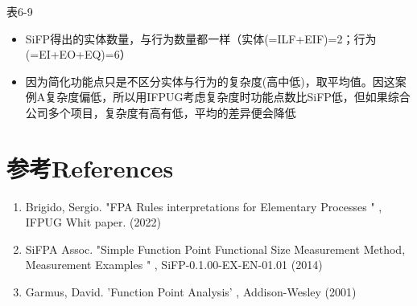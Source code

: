 表6-9

\begin{itemize}
\tightlist
\item
  SiFP得出的实体数量，与行为数量都一样（实体(=ILF+EIF)=2；行为(=EI+EO+EQ)=6）
\item
  因为简化功能点只是不区分实体与行为的复杂度(高中低)，取平均值。因这案例A复杂度偏低，所以用IFPUG考虑复杂度时功能点数比SiFP低，但如果综合公司多个项目，复杂度有高有低，平均的差异便会降低
\end{itemize}

\hypertarget{ux53c2ux8003references}{%
\section{参考References}\label{ux53c2ux8003references}}

\begin{enumerate}
\tightlist
\item
  Brigido, Sergio. "FPA Rules interpretations for Elementary Processes "
  , IFPUG Whit paper. (2022)\\
\item
  SiFPA Assoc. "Simple Function Point Functional Size Measurement
  Method, Measurement Examples " , SiFP-0.1.00-EX-EN-01.01 (2014)\\
\item
  Garmus, David. 'Function Point Analysis' , Addison-Wesley (2001)
\end{enumerate}
